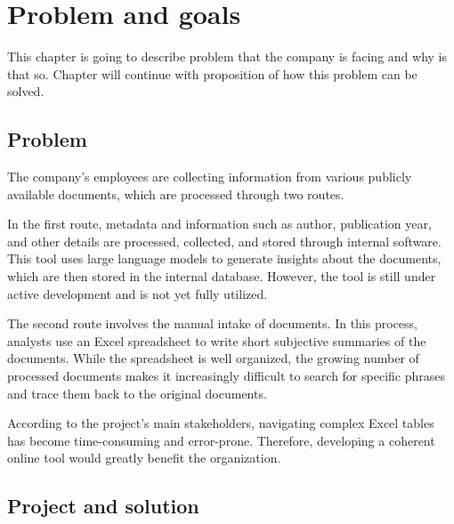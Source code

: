 \section{Problem and goals}
\label{sec:Problem-and-goals}

This chapter is going to describe problem that the company is facing and why is that so. Chapter will continue with proposition of how this problem can be solved. 

\subsection{Problem}
\label{subsec:Problem}
The company’s employees are collecting information from various publicly available documents, which are processed through two routes.

In the first route, metadata and information such as author, publication year, and other details are processed, collected, and stored through internal software. This tool uses large language models to generate insights about the documents, which are then stored in the internal database. However, the tool is still under active development and is not yet fully utilized.

The second route involves the manual intake of documents. In this process, analysts use an Excel spreadsheet to write short subjective summaries of the documents. While the spreadsheet is well organized, the growing number of processed documents makes it increasingly difficult to search for specific phrases and trace them back to the original documents.

According to the project’s main stakeholders, navigating complex Excel tables has become time-consuming and error-prone. Therefore, developing a coherent online tool would greatly benefit the organization.

\subsection{Project and solution}
\label{subsec:Project-or-Solution}

